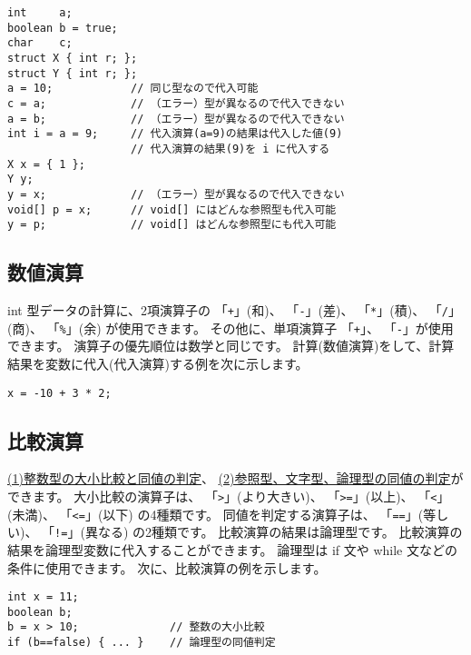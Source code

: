 \begin{mylist}
\begin{verbatim}
int     a;
boolean b = true;
char    c;
struct X { int r; };
struct Y { int r; };
a = 10;            // 同じ型なので代入可能
c = a;             // （エラー）型が異なるので代入できない
a = b;             // （エラー）型が異なるので代入できない
int i = a = 9;     // 代入演算(a=9)の結果は代入した値(9)
                   // 代入演算の結果(9)を i に代入する
X x = { 1 };
Y y;
y = x;             // （エラー）型が異なるので代入できない
void[] p = x;      // void[] にはどんな参照型も代入可能
y = p;             // void[] はどんな参照型にも代入可能
\end{verbatim}
\end{mylist}

\subsection{数値演算}

int 型データの計算に、2項演算子の
「\verb/+/」(和)、
「\verb/-/」(差)、
「\verb/*/」(積)、
「\verb+/+」(商)、
「\verb/%/」(余)
が使用できます。
その他に、単項演算子
「\verb/+/」、
「\verb/-/」が使用できます。
演算子の優先順位は数学と同じです。
計算(数値演算)をして、計算結果を変数に代入(代入演算)する例を次に示します。

\begin{mylist}
\begin{verbatim}
x = -10 + 3 * 2;
\end{verbatim}
\end{mylist}

\subsection{比較演算}

\underline{(1)整数型の大小比較と同値の判定}、
\underline{(2)参照型、文字型、論理型の同値の判定}ができます。
大小比較の演算子は、
「\verb/>/」(より大きい)、
「\verb/>=/」(以上)、
「\verb/</」(未満)、
「\verb/<=/」(以下) の4種類です。
同値を判定する演算子は、
「\verb/==/」(等しい)、
「\verb/!=/」(異なる)
の2種類です。
比較演算の結果は論理型です。
比較演算の結果を論理型変数に代入することができます。
論理型は if 文や while 文などの条件に使用できます。
次に、比較演算の例を示します。

\begin{mylist}
\begin{verbatim}
int x = 11;
boolean b;
b = x > 10;              // 整数の大小比較
if (b==false) { ... }    // 論理型の同値判定
\end{verbatim}
\end{mylist}

